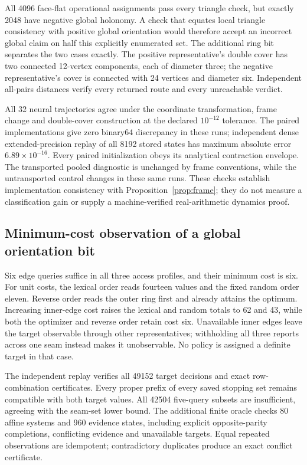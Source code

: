 \documentclass[11pt,a4paper]{article}
\theoremstyle{definition}\newtheorem{definition}[theorem]{Definition}
\begin{document}
All 4096 face-flat operational assignments pass every triangle check, but exactly 2048 have negative global holonomy. A check that equates local triangle consistency with positive global orientation would therefore accept an incorrect global claim on half this explicitly enumerated set. The additional ring bit separates the two cases exactly. The positive representative's double cover has two connected 12-vertex components, each of diameter three; the negative representative's cover is connected with 24 vertices and diameter six. Independent all-pairs distances verify every returned route and every unreachable verdict.

All 32 neural trajectories agree under the coordinate transformation, frame change and double-cover construction at the declared $10^{-12}$ tolerance. The paired implementations give zero binary64 discrepancy in these runs; independent dense extended-precision replay of all 8192 stored states has maximum absolute error $6.89\times10^{-16}$. Every paired initialization obeys its analytical contraction envelope. The transported pooled diagnostic is unchanged by frame conventions, while the untransported control changes in these same runs. These checks establish implementation consistency with Proposition~\ref{prop:frame}; they do not measure a classification gain or supply a machine-verified real-arithmetic dynamics proof.

\subsection{Minimum-cost observation of a global orientation bit}

Six edge queries suffice in all three access profiles, and their minimum cost is six. For unit costs, the lexical order reads fourteen values and the fixed random order eleven. Reverse order reads the outer ring first and already attains the optimum. Increasing inner-edge cost raises the lexical and random totals to 62 and 43, while both the optimizer and reverse order retain cost six. Unavailable inner edges leave the target observable through other representatives; withholding all three reports across one seam instead makes it unobservable. No policy is assigned a definite target in that case.

The independent replay verifies all 49152 target decisions and exact row-combination certificates. Every proper prefix of every saved stopping set remains compatible with both target values. All 42504 five-query subsets are insufficient, agreeing with the seam-set lower bound. The additional finite oracle checks 80 affine systems and 960 evidence states, including explicit opposite-parity completions, conflicting evidence and unavailable targets. Equal repeated observations are idempotent; contradictory duplicates produce an exact conflict certificate.
\end{document}
